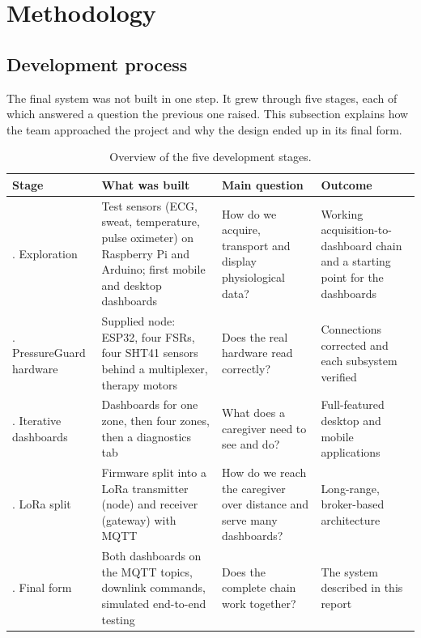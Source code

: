 \clearpage
\section{Methodology}
\label{sec:method}

\subsection{Development process}
The final system was not built in one step. It grew through five stages, each of which answered a question the previous one raised. This subsection explains how the team approached the project and why the design ended up in its final form.

{\small{}
\begin{table}[H]
\centering
\begin{tabularx}{\textwidth}{@{}>{\raggedright\arraybackslash}p{2.3cm}>{\raggedright\arraybackslash}p{4.2cm}>{\raggedright\arraybackslash}p{3.3cm}X@{}}
\toprule
\textbf{Stage} & \textbf{What was built} & \textbf{Main question} & \textbf{Outcome}\\
\midrule
1. Exploration & Test sensors (ECG, sweat, temperature, pulse oximeter) on Raspberry Pi and Arduino; first mobile and desktop dashboards & How do we acquire, transport and display physiological data? & Working acquisition-to-dashboard chain and a starting point for the dashboards\\
2. PressureGuard hardware & Supplied node: ESP32, four FSRs, four SHT41 sensors behind a multiplexer, therapy motors & Does the real hardware read correctly? & Connections corrected and each subsystem verified\\
3. Iterative dashboards & Dashboards for one zone, then four zones, then a diagnostics tab & What does a caregiver need to see and do? & Full-featured desktop and mobile applications\\
4. LoRa split & Firmware split into a LoRa transmitter (node) and receiver (gateway) with MQTT & How do we reach the caregiver over distance and serve many dashboards? & Long-range, broker-based architecture\\
5. Final form & Both dashboards on the MQTT topics, downlink commands, simulated end-to-end testing & Does the complete chain work together? & The system described in this report\\
\bottomrule
\end{tabularx}
\caption{Overview of the five development stages.}
\end{table}}

